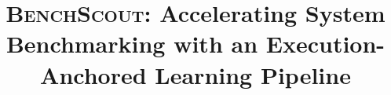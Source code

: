 \documentclass[sigplan,10pt]{acmart}
\newcommand{\ourmethod}{\textsc{BenchScout}\xspace}
\begin{document}
\pagestyle{plain}

\title[\ourmethod]{\ourmethod: Accelerating System Benchmarking with an Execution-Anchored Learning Pipeline}



\renewcommand{\shortauthors}{Trovato et al.}
\end{document}
